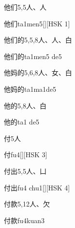 \begin{entry}{他们}{5,5}{⼈、⼈}
  \begin{phonetics}{他们}{ta1men5}[][HSK 1]
  \end{phonetics}
\end{entry}

\begin{entry}{他们的}{5,5,8}{⼈、⼈、⽩}
  \begin{phonetics}{他们的}{ta1men5 de5}
  \end{phonetics}
\end{entry}

\begin{entry}{他妈的}{5,6,8}{⼈、⼥、⽩}
  \begin{phonetics}{他妈的}{ta1ma1de5}
  \end{phonetics}
\end{entry}

\begin{entry}{他的}{5,8}{⼈、⽩}
  \begin{phonetics}{他的}{ta1 de5}
  \end{phonetics}
\end{entry}

\begin{entry}{付}{5}{⼈}
  \begin{phonetics}{付}{fu4}[][HSK 3]
  \end{phonetics}
\end{entry}

\begin{entry}{付出}{5,5}{⼈、⼐}
  \begin{phonetics}{付出}{fu4 chu1}[][HSK 4]
  \end{phonetics}
\end{entry}

\begin{entry}{付款}{5,12}{⼈、⽋}
  \begin{phonetics}{付款}{fu4kuan3}
  \end{phonetics}
\end{entry}

